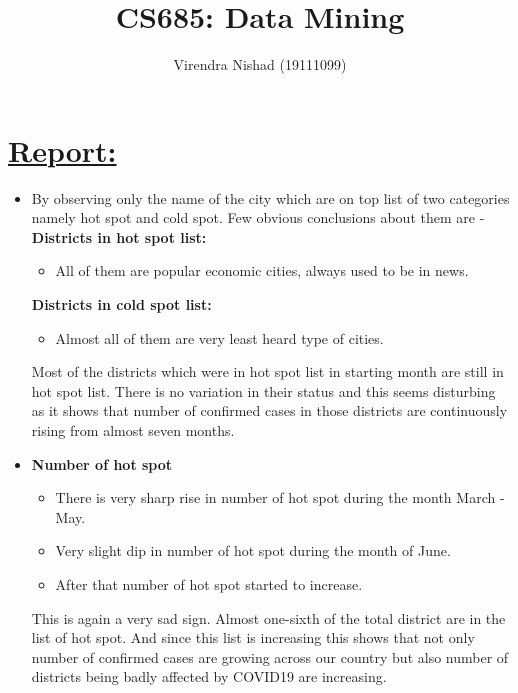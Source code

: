 \documentclass{article}
\title{CS685: Data Mining}
\author{Virendra Nishad (19111099)}
\date{}
\begin{document}
\maketitle
\vspace{5mm}
\section*{\underline{Report:}}
\vspace{5mm}
\begin{itemize}
    \item By observing only the name of the city which are on top list of two categories namely hot spot and cold spot. Few obvious conclusions about them are - \\
    \textbf{Districts in hot spot list:}
    \begin{itemize}
        \item All of them are popular economic cities, always used to be in news.
    \end{itemize}
    \textbf{Districts in cold spot list:}
    \begin{itemize}
        \item Almost all of them are very least heard type of cities.
    \end{itemize}
    
    Most of the districts which were in hot spot list in starting month are still in hot spot list. There is no variation in their status and this seems disturbing as it shows that number of confirmed cases in those districts are  continuously rising from almost seven months.
    
    \vspace{5mm}
    \item \textbf{Number of hot spot}
    \begin{itemize}
        \item There is very sharp rise in number of hot spot during the month March - May.
        \item Very slight dip in number of hot spot during the month of June.
        \item After that number of hot spot started to increase.
    \end{itemize}
    
    This is again a very sad sign. Almost one-sixth of the total district are in the list of hot spot. And since this list is increasing this shows that not only number of confirmed cases are growing across our country but also number of districts being badly affected by COVID19 are increasing.
    

\end{itemize}
\end{document}
